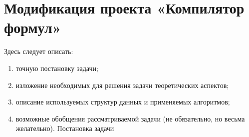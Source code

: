\section{Модификация проекта «Компилятор формул»}

Здесь следует описать:

\begin{enumerate}[1)]
\item точную постановку задачи;
\item изложение необходимых для решения задачи теоретических аспектов;
\item описание используемых структур данных и применяемых алгоритмов;
\item возможные обобщения рассматриваемой задачи (не обязательно, но
      весьма желательно).
        Постановка задачи

\end{enumerate}
